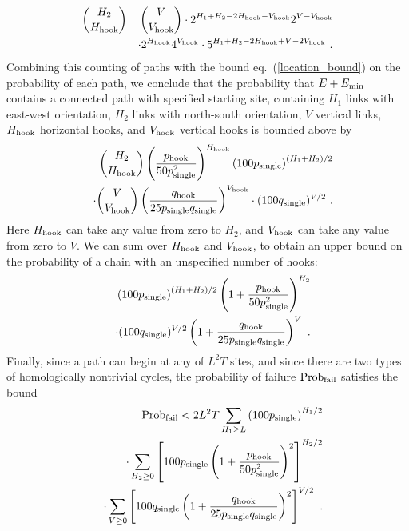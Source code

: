\begin{eqnarray}
{{H_2}\choose{H_{\rm hook}} }&&{{V}\choose{V_{\rm hook}} }\cdot 2^{H_1+H_2-2H_{\rm hook}-V_{\rm hook}}2^{V-V_{\rm hook}}\nonumber\\
&& \cdot2^{H_{\rm hook}}4^{V_{\rm hook}}\cdot 5^{H_1 +H_2 - 2H_{\rm hook} +V-2V_{\rm hook}}~.
\end{eqnarray}
Combining this counting of paths with the bound eq.~(\ref{location_bound}) on the probability of each path, we conclude that the  probability that $E+E_{\rm min}$ contains a connected path with specified starting site, containing $H_1$ links with east-west orientation, $H_2$ links with north-south orientation, $V$ vertical links, $H_{\rm hook}$ horizontal hooks, and $V_{\rm hook}$ vertical hooks is bounded above by
\begin{eqnarray}
&&{H_2\choose H_{\rm hook}} \left(p_{\rm hook}\over 50 p_{\rm single}^2\right)^{H_{\rm hook}}\left(100 p_{\rm single}\right)^{(H_1+H_2)/2}\nonumber\\
&&\cdot {{V}\choose{V_{\rm hook}} }\left(q_{\rm hook}\over 25 p_{\rm single}q_{\rm single}\right)^{V_{\rm hook}}
\cdot(100 q_{\rm single})^{V/2}~.
\end{eqnarray}
Here $H_{\rm hook}$ can take any value from zero to $H_2$, and $V_{\rm hook}$ can take any value from zero to $V$. We can sum over $H_{\rm hook}$ and $V_{\rm hook}$, to obtain an upper bound on the probability of a chain with an unspecified number of hooks:
\begin{eqnarray}
&&\left(100 p_{\rm single}\right)^{(H_1+H_2)/2}\left(1 +{p_{\rm hook}\over 50 p_{\rm single}^2}\right)^{H_2}\nonumber\\
&&\cdot (100 q_{\rm single})^{V/2}\left(1 +{q_{\rm hook}\over 25 p_{\rm single}q_{\rm single}}\right)^{V}~.
\end{eqnarray}
Finally, since a path can begin at any of $L^2T$ sites, and since there are two types of homologically nontrivial cycles, the probability of failure ${\rm Prob}_{\rm fail}$ satisfies the bound
\begin{eqnarray}
&&{\rm Prob}_{\rm fail} < 2L^2T \sum_{H_1\ge L} \left(100 p_{\rm single}\right)^{H_1/2}
\nonumber\\
&&\cdot  \sum_{H_2\ge 0}\left[100 p_{\rm single}\left(1 +{p_{\rm hook}\over 50 p_{\rm single}^2}\right)^2\right]^{H_2/2}\nonumber\\
&&\cdot\sum_{V\ge 0} \left[100 q_{\rm single}\left(1 +{q_{\rm hook}\over 25 p_{\rm single}q_{\rm single}}\right)^2\right]^{V/2}
~.
\end{eqnarray}
